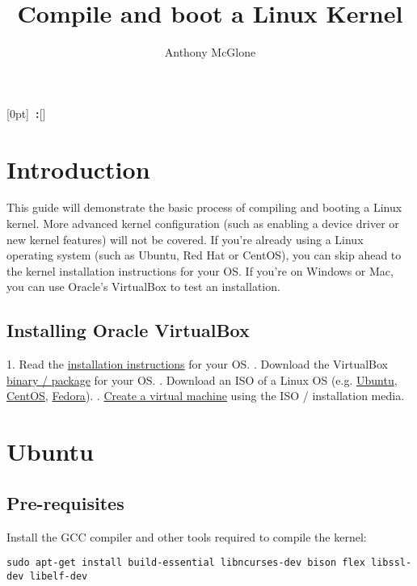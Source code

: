 \documentclass[12pt,a4paper]{report}
\author{Anthony McGlone}\title{Compile and boot a Linux Kernel}
\newcommand{\setupname}[1][\chaptername]{
\titlecontents{chapter}[0pt]{\vspace{1ex}}{\bfseries#1~\thecontentslabel:\quad}{\bfseries}{\bfseries\hfill\contentspage}[]
}
\begin{document}
\maketitle

\tableofcontents

\setupname
\chapter{Introduction}

This guide will demonstrate the basic process of compiling and booting a Linux kernel. More advanced kernel configuration (such as enabling a device driver or new kernel features) will not be covered. 
\newline
\newline
If you're already using a Linux operating system (such as Ubuntu, Red Hat or CentOS), you can skip ahead to the kernel installation instructions for your OS. 
\newline
\newline
If you're on Windows or Mac, you can use Oracle's VirtualBox to test an installation.

\section{Installing Oracle VirtualBox}

1. Read the \href{https://www.virtualbox.org/manual/ch02.html}{installation instructions} for your OS.
. Download the VirtualBox \href{https://www.virtualbox.org/wiki/Downloads}{binary / package} for your OS.
. Download an ISO of a Linux OS (e.g. \href{https://ubuntu.com/download/desktop}{Ubuntu}, \href{https://www.centos.org/download/}{CentOS}, \href{https://getfedora.org/workstation/download/}{Fedora}).
. \href{https://docs.oracle.com/cd/E26217_01/E26796/html/qs-create-vm.html}{Create a virtual machine} using the ISO / installation media.



\chapter{Ubuntu}

\section{Pre-requisites}
Install the GCC compiler and other tools required to compile the kernel:
\newline
\newline
\centerline{\texttt{\scriptsize sudo apt-get install build-essential libncurses-dev bison flex libssl-dev libelf-dev}}
\end{document}
